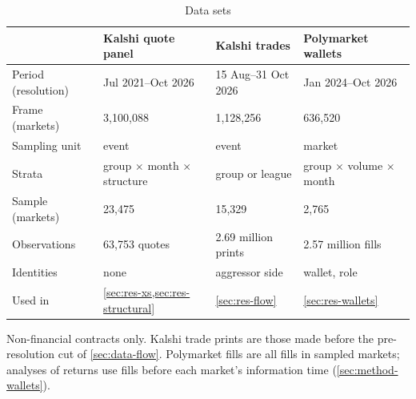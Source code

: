 \begin{table}[t]
\centering
\begin{threeparttable}
\caption{Data sets}\label{tab:data-overview}
\footnotesize
\begin{tabular}{@{}llll@{}}
\toprule
 & Kalshi quote panel & Kalshi trades & Polymarket wallets \\
\midrule
Period (resolution) & Jul 2021--Oct 2026 & 15 Aug--31 Oct 2026 & Jan 2024--Oct 2026 \\
Frame (markets) & 3{,}100{,}088 & 1{,}128{,}256 & 636{,}520 \\
Sampling unit & event & event & market \\
Strata & group $\times$ month $\times$ structure & group or league & group $\times$ volume $\times$ month \\
Sample (markets) & 23{,}475 & 15{,}329 & 2{,}765 \\
Observations & 63{,}753 quotes & 2.69 million prints & 2.57 million fills \\
Identities & none & aggressor side & wallet, role \\
Used in & \cref{sec:res-xs,sec:res-structural} & \cref{sec:res-flow} & \cref{sec:res-wallets} \\
\bottomrule
\end{tabular}
\begin{tablenotes}\footnotesize
\item Non-financial contracts only. Kalshi trade prints are those made before the
pre-resolution cut of \cref{sec:data-flow}. Polymarket fills are all fills in sampled markets;
analyses of returns use fills before each market's information time
(\cref{sec:method-wallets}).
\end{tablenotes}
\end{threeparttable}
\end{table}
